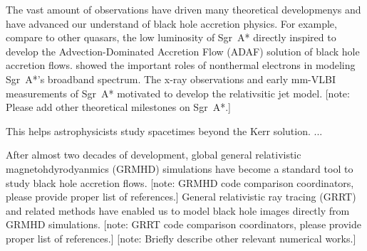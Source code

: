 \documentclass[twocolumn,tighten,dvipsnames]{aastex63}
\newcommand\sgra{Sgr~A*\xspace}
\newcommand\<{{\langle}}
\renewcommand\>{{\rangle}} %
\newcommand\note[1]{{\color{OliveGreen}[note: #1]}}
\begin{document}
The vast amount of observations have driven many theoretical
developmenys and have advanced our understand of black hole accretion
physics.
For example, compare to other quasars, the low luminosity of \sgra
directly inspired \citet{1994ApJ...428L..13N, 1995ApJ...444..231N,
  1995ApJ...452..710N, 1996A&AS..120C.287N, 1998ApJ...492..554N} to
develop the Advection-Dominated Accretion Flow (ADAF) solution of
black hole accretion flows.
\citet{2000ApJ...541..234O} showed the important roles of nonthermal
electrons in modeling \sgra's broadband spectrum.
The x-ray observations and early mm-VLBI measurements of \sgra
motivated \citet{2000A&A...362..113F, 2004A&A...414..895F,
  2005ApJ...635.1203M} to develop the relativsitic jet model.
\note{Please add other theoretical milestones on \sgra.}

This helps astrophysicists study spacetimes beyond the Kerr solution.
...

After almost two decades of development, global general relativistic
magnetohdyrodyanmics (GRMHD) simulations
\citep[e.g.,][]{2000ApJ...528..462H, 2003ApJ...589..458D,
  2003ApJ...589..444G, 2007CQGra..24S.235G, 2012ApJS..201....9F,
  2014ApJ...796...22F, 2016ApJS..225...22W, 2017ApJS..231...17A,
  2018JPhCS1031a2008O, 2019A&A...629A..61O, 2019ApJS..243...26P} have
become a standard tool to study black hole accretion flows.
\note{GRMHD code comparison coordinators, please provide proper list
  of references.}
General relativistic ray tracing (GRRT) and related methods
\citep[e.g.,][]{2009ApJ...696.1616D, 2009ApJS..184..387D,
  2012ApJ...745....1P, 2013ApJ...777...11S, 2013ApJ...777...13C,
  2016MNRAS.462..115D, 2016ApJ...820..105P, 2018ApJ...867...59C,
  2018A&A...613A...2B, 2020ApJ...897..148G, 2020arXiv200703045B} have
enabled us to model black hole images directly from GRMHD simulations.
\note{GRRT code comparison coordinators, please provide proper list of
  references.}
\note{Briefly describe other relevant numerical works.}
\end{document}
